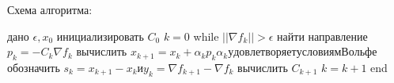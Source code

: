 \documentclass[12pt, a4paper]{extarticle}
\begin{document}
Схема алгоритма:
\begin{flushleft}
дано $ \epsilon , x_{0} $ \newline
инициализировать $C_{0}$ \newline
$ k=0$ \newline
while $||\nabla f_{k}||>\epsilon$ \newline
найти направление $p_{k}=-C_{k}\nabla f_{k}$ \newline
вычислить $x_{k+1}=x_{k}+\alpha _{k}p_{k} \alpha _{k} удовлетворяет условиям Вольфе $ \newline
обозначить $s_{k}=x_{k+1}-x_{k} и y_{k}=\nabla f_{k+1}-\nabla f_{k} $ \newline
вычислить $C_{k+1}$ \newline
$ k=k+1$ \newline
end \newline
\end{flushleft}

\newpage
\end{document}
